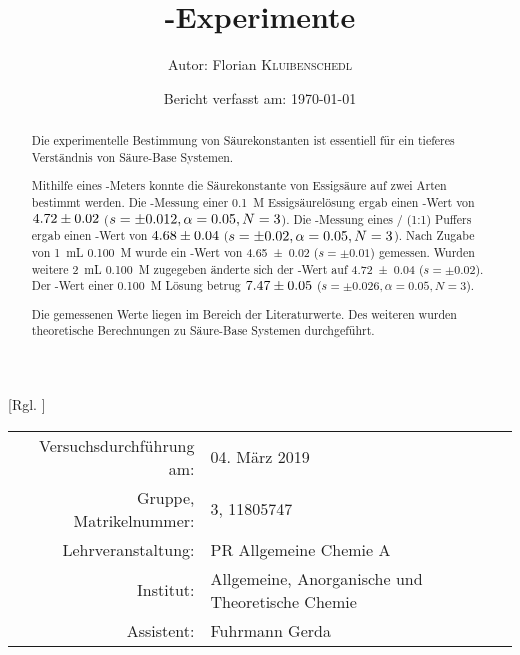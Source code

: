 \documentclass{article}
\title{\pH-Experimente \cite{Versuchsvorschrift}} %
\author{Autor: Florian \textsc{Kluibenschedl}} %
\date{Bericht verfasst am: \today} %
\begin{document}
  [Rgl. ]{}{}
  
  \maketitle %
  
  \begin{center}
    \begin{tabular}{r p{4cm}}
      Versuchsdurchführung am: & 04. März 2019\\ %
      Gruppe, Matrikelnummer: & 3, 11805747 \\
      Lehrveranstaltung: & PR Allgemeine Chemie A \\
      Institut: & Allgemeine, Anorganische und Theoretische Chemie \\
      Assistent: & Fuhrmann Gerda %
    \end{tabular}
  \end{center}


  \begin{abstract}
    Die experimentelle Bestimmung von Säurekonstanten ist essentiell für ein tieferes Verständnis von Säure-Base Systemen.
    
     Mithilfe eines \pH-Meters konnte die Säurekonstante von Essigsäure auf zwei Arten bestimmt werden. Die \pH-Messung einer \SI[mode=text]{0.1}{M} Essigsäurelösung ergab einen \pKa-Wert von $\num[separate-uncertainty]{4.72 \pm 0.02}$ ($s = \num{\pm 0.012},\alpha = 0.05, N = 3$). Die \pH-Messung eines / (1:1) Puffers ergab einen \pKa-Wert von $\num[separate-uncertainty]{4.68 \pm 0.04}$ ($s = \num{\pm 0.02},\alpha = 0.05, N = 3$). Nach Zugabe von \SI[mode=text]{1}{\milli\liter} \SI[mode=text]{0.100}{M}  wurde ein \pH-Wert von \num[separate-uncertainty]{4.65 \pm 0.02} ($s = \pm 0.01$) gemessen. Wurden weitere \SI[mode=text]{2}{\milli\liter} \SI[mode=text]{0.100}{M}  zugegeben änderte sich der \pH-Wert auf \num[separate-uncertainty]{4.72 \pm 0.04} ($s = \pm 0.02$). Der \pH-Wert einer \SI[mode=text]{0.100}{M}  Lösung betrug $\num[separate-uncertainty]{7.47 \pm 0.05}$ ($s = \pm 0.026,\alpha = 0.05, N = 3$). 
     
     Die gemessenen Werte liegen im Bereich der Literaturwerte. Des weiteren wurden theoretische Berechnungen zu Säure-Base Systemen durchgeführt.
  \end{abstract}
  
  \pagebreak
  
\end{document}
